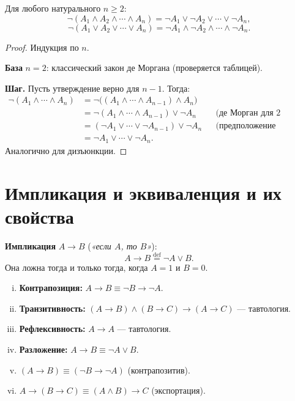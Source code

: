 \documentclass[12pt]{article}
\begin{document}
\begin{theorem}
Для любого натурального $n \geq 2$:
\[
\neg(A_1 \wedge A_2 \wedge \cdots \wedge A_n)
= \neg A_1 \vee \neg A_2 \vee \cdots \vee \neg A_n,
\]
\[
\neg(A_1 \vee A_2 \vee \cdots \vee A_n)
= \neg A_1 \wedge \neg A_2 \wedge \cdots \wedge \neg A_n.
\]
\end{theorem}
\begin{proof}
Индукция по $n$.

\textbf{База} $n = 2$: классический закон де Моргана (проверяется таблицей).

\textbf{Шаг.} Пусть утверждение верно для $n-1$. Тогда:
\begin{align*}
\neg(A_1 \wedge \cdots \wedge A_n)
&= \neg\bigl((A_1 \wedge \cdots \wedge A_{n-1}) \wedge A_n\bigr) \\
&= \neg(A_1 \wedge \cdots \wedge A_{n-1}) \vee \neg A_n
   & &\text{(де Морган для 2 аргументов)}\\
&= (\neg A_1 \vee \cdots \vee \neg A_{n-1}) \vee \neg A_n
   & &\text{(предположение индукции)}\\
&= \neg A_1 \vee \cdots \vee \neg A_n.
\end{align*}
Аналогично для дизъюнкции.
\end{proof}

\section{Импликация и эквиваленция и их свойства}

\begin{definition}
\textbf{Импликация} $A \to B$ (\emph{«если $A$, то $B$»}):
\[
A \to B \stackrel{\mathrm{def}}{=} \neg A \vee B.
\]
Она ложна тогда и только тогда, когда $A = 1$ и $B = 0$.
\end{definition}

\begin{property}
\begin{enumerate}[(i)]
\item \textbf{Контрапозиция:} $A \to B \equiv \neg B \to \neg A$.
\item \textbf{Транзитивность:} $(A \to B) \wedge (B \to C) \to (A \to C)$ ---
      тавтология.
\item \textbf{Рефлексивность:} $A \to A$ --- тавтология.
\item \textbf{Разложение:} $A \to B \equiv \neg A \vee B$.
\item $(A \to B) \equiv (\neg B \to \neg A)$ (контрапозитив).
\item $A \to (B \to C) \equiv (A \wedge B) \to C$ (экспортация).
\end{enumerate}
\end{property}
\end{document}
